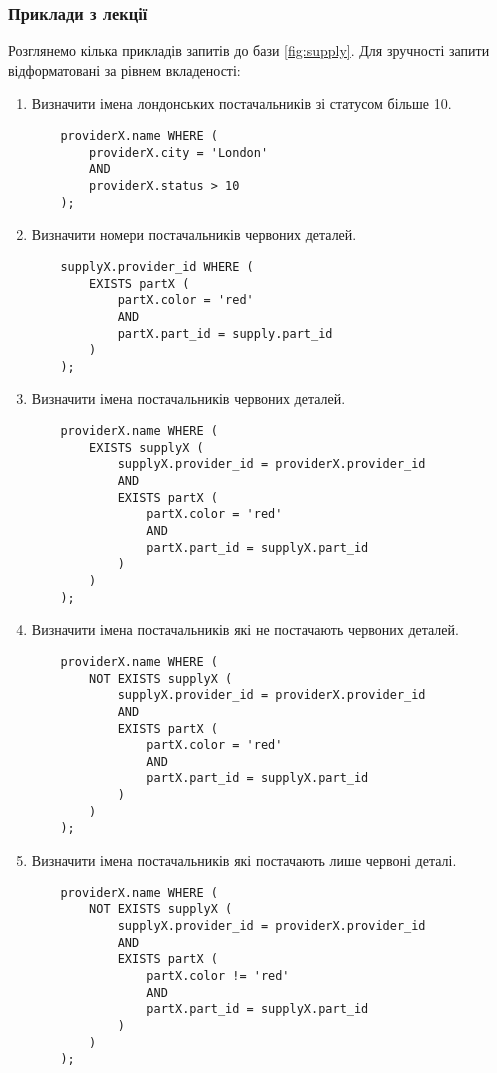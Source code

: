 \subsubsection{Приклади з лекції}
Розглянемо кілька прикладів запитів до бази \ref{fig:supply}. Для зручності запити відформатовані за рівнем вкладеності:

\begin{enumerate}
    \item Визначити імена лондонських постачальників зі статусом більше 10. 
    \begin{verbatim}
    providerX.name WHERE (
        providerX.city = 'London' 
        AND 
        providerX.status > 10
    );
    \end{verbatim}
    
    \item Визначити номери постачальників червоних деталей. 
    \begin{verbatim}
    supplyX.provider_id WHERE (
        EXISTS partX (
            partX.color = 'red' 
            AND 
            partX.part_id = supply.part_id
        )
    );
    \end{verbatim}
    
    \item Визначити імена постачальників червоних деталей. 
    \begin{verbatim}
    providerX.name WHERE (
        EXISTS supplyX (
            supplyX.provider_id = providerX.provider_id
            AND
            EXISTS partX (
                partX.color = 'red'
                AND 
                partX.part_id = supplyX.part_id
            )
        )
    );
    \end{verbatim}
    
    \item Визначити імена постачальників які не постачають червоних деталей.
    \begin{verbatim}
    providerX.name WHERE (
        NOT EXISTS supplyX (
            supplyX.provider_id = providerX.provider_id
            AND
            EXISTS partX (
                partX.color = 'red' 
                AND 
                partX.part_id = supplyX.part_id
            )
        )
    );
    \end{verbatim}
    
    \item Визначити імена постачальників які постачають лише червоні деталі.
    \begin{verbatim}
    providerX.name WHERE (
        NOT EXISTS supplyX (
            supplyX.provider_id = providerX.provider_id
            AND
            EXISTS partX (
                partX.color != 'red' 
                AND 
                partX.part_id = supplyX.part_id
            )
        )
    );
    \end{verbatim}
    

\end{enumerate}
